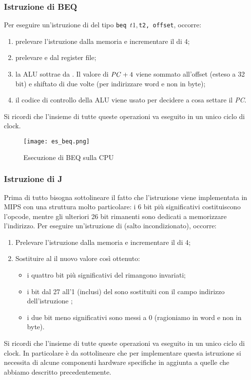 \subsubsection{Istruzione di BEQ}
Per eseguire un'istruzione di  del tipo \texttt{beq $t1, $t2, offset}, occorre:
\begin{enumerate}
	\item prelevare l’istruzione dalla memoria e incrementare il  di 4;
	\item prelevare  e  dal register file;
	\item la ALU sottrae  da . Il valore di \(\textrm{\emph{PC}}+4\) viene sommato all’offset (esteso a 32 bit) e shiftato di due volte (per indirizzare word e non in byte);
	\item il codice di controllo  della ALU viene usato per decidere a cosa settare il \emph{PC}.
\end{enumerate}
Si ricordi che l'insieme di tutte queste operazioni va eseguito in un unico ciclo di clock.

\begin{figure}[H]
	\centering
	\texttt{[image: es\_beq.png]}
	\caption{Esecuzione di BEQ sulla CPU}
\end{figure}

\subsubsection{Istruzione di J}
Prima di tutto bisogna sottolineare il fatto che l'istruzione  viene implementata in MIPS con una struttura molto particolare: i 6 bit più significativi costituiscono l'opcode, mentre gli ulteriori 26 bit rimanenti sono dedicati a memorizzare l'indirizzo. Per eseguire un'istruzione di  (salto incondizionato), occorre:
\begin{enumerate}
	\item Prelevare l’istruzione dalla memoria e incrementare il  di 4;
	\item Sostituire al  il nuovo valore così ottenuto:
	\begin{itemize}
		\item i quattro bit più significativi del  rimangono invariati;
		\item i bit dal 27 all'1 (inclusi) del  sono sostituiti con il campo indirizzo dell'istruzione ;
		\item i due bit meno significativi sono messi a 0 (ragioniamo in word e non in byte).
	\end{itemize}
\end{enumerate}
Si ricordi che l'insieme di tutte queste operazioni va eseguito in un unico ciclo di clock. In particolare è da sottolineare che per implementare questa istruzione si necessita di alcune componenti hardware specifiche in aggiunta a quelle che abbiamo descritto precedentemente.

